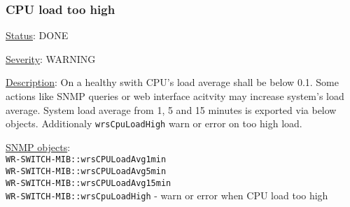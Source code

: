 \subsubsection{\bf CPU load too high}
		\label{fail:other:cpu}
		\begin{packed_enum}
			\item [] \underline{Status}: DONE
			\item [] \underline{Severity}: WARNING
			\item [] \underline{Description}:
				On a healthy swith CPU's load average shall be below 0.1. Some actions like
				SNMP queries or web interface acitvity may increase system's load average.
				System load average from 1, 5 and 15 minutes is exported via below objects.
				Additionaly \texttt{wrsCpuLoadHigh} warn or error on too high load.
			\item [] \underline{SNMP objects}:\\
				\texttt{WR-SWITCH-MIB::wrsCPULoadAvg1min}\\
				\texttt{WR-SWITCH-MIB::wrsCPULoadAvg5min}\\
				\texttt{WR-SWITCH-MIB::wrsCPULoadAvg15min}\\
				\texttt{WR-SWITCH-MIB::wrsCpuLoadHigh} - warn or error when CPU load too high
		\end{packed_enum}

